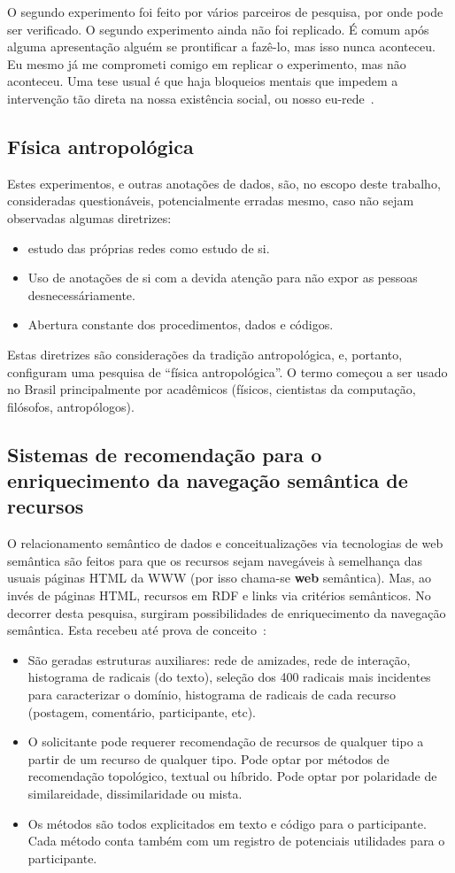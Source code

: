 \documentclass[a4paper,openright,12pt]{report} %
\begin{document}
O segundo experimento foi feito por vários parceiros de pesquisa, por onde pode ser verificado.
O segundo experimento ainda não foi replicado.
É comum após alguma apresentação alguém se prontificar a fazê-lo,
mas isso nunca aconteceu. 
Eu mesmo já me comprometi comigo em replicar o experimento,
mas não aconteceu. Uma tese usual é que haja bloqueios
mentais que impedem a intervenção tão direta na nossa existência
social, ou nosso eu-rede~\cite{latour,ciberiun}.

\subsection{Física antropológica}
Estes experimentos, e outras anotações de dados, são, no escopo deste
trabalho, consideradas questionáveis, potencialmente erradas mesmo,
caso não sejam observadas algumas diretrizes:
\begin{itemize}
	\item estudo das próprias redes como estudo de si.
	\item Uso de anotações de si com a devida atenção para não expor as pessoas desnecessáriamente.
	\item Abertura constante dos procedimentos, dados e códigos.
\end{itemize}
Estas diretrizes são considerações da tradição antropológica,
e, portanto, configuram uma pesquisa de ``física antropológica''.
O termo começou a ser usado no Brasil principalmente por
acadêmicos (físicos, cientistas da computação, filósofos, antropólogos).

\subsection{Sistemas de recomendação para o enriquecimento da navegação semântica de recursos}
O relacionamento semântico de dados e conceitualizações via tecnologias de web semântica são feitos para que os recursos sejam navegáveis à semelhança das usuais páginas HTML da WWW (por isso chama-se {\bf web} semântica).
Mas, ao invés de páginas HTML, recursos em RDF e links via critérios semânticos.
No decorrer desta pesquisa, surgiram possibilidades de enriquecimento
da navegação semântica. Esta recebeu até prova de conceito~\cite{pnud4}:
\begin{itemize}
	\item São geradas estruturas auxiliares: rede de amizades, rede de interação, histograma de radicais (do texto), seleção dos 400 radicais
		mais incidentes para caracterizar o domínio,
		histograma de radicais de cada recurso (postagem, comentário, participante, etc).
	\item O solicitante pode requerer recomendação de recursos
		de qualquer tipo a partir de um recurso de qualquer
		tipo. Pode optar por métodos de recomendação topológico, textual ou híbrido. Pode optar por polaridade de similareidade, dissimilaridade ou mista.
	\item Os métodos são todos explicitados em texto e código
		para o participante. Cada método conta também com um
		registro de potenciais utilidades para o participante.
\end{itemize}
\end{document}
